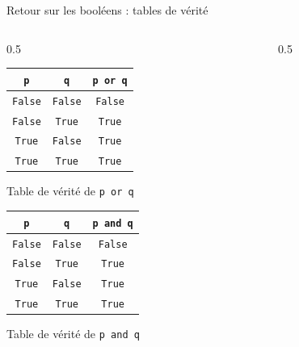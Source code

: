 \documentclass{beamer}
\begin{document}
  \begin{frame}{Retour sur les booléens : tables de vérité}

    \bigskip

    \begin{columns}
      \begin{column}{0.5\textwidth}
    \begin{tabular}{|c|c||c|}
      \hline
       \texttt{p} & \texttt{q} & \texttt{p or q} \\
      \hline
      \hline
      \texttt{False}  & \texttt{False}  & \texttt{False} \\
      \hline
      \texttt{False}  & \texttt{True}   & \texttt{True} \\
      \hline
      \texttt{True}   & \texttt{False}  & \texttt{True} \\
      \hline
      \texttt{True}   & \texttt{True}   & \texttt{True} \\
      \hline
    \end{tabular}%

    \medskip

    Table de vérité de \texttt{p or q}

    \bigskip

    \begin{tabular}{|c|c||c|}
      \hline
       \texttt{p} & \texttt{q} & \texttt{p and q} \\
      \hline
      \hline
      \texttt{False}  & \texttt{False}  & \texttt{False} \\
      \hline
      \texttt{False}  & \texttt{True}   & \texttt{True} \\
      \hline
      \texttt{True}   & \texttt{False}  & \texttt{True} \\
      \hline
      \texttt{True}   & \texttt{True}   & \texttt{True} \\
      \hline
    \end{tabular}%

    \medskip

    Table de vérité de \texttt{p and q}
    \end{column}
      \begin{column}{0.5\textwidth}


\end{column}
\end{columns}
\end{frame}
\end{document}
